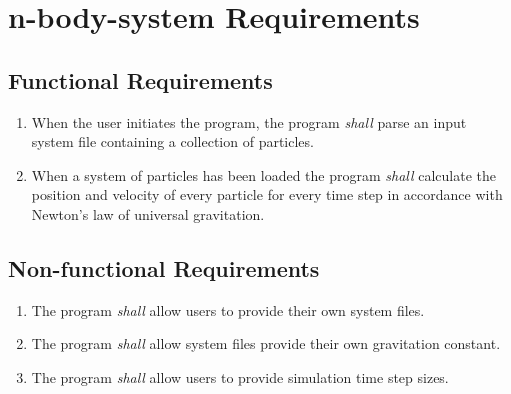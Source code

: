 \documentclass[12pt]{article}
\begin{document}
\section*{n-body-system Requirements}
	\subsection*{Functional Requirements}
		\begin{enumerate}[label=FR-\arabic*]
			\item \label{FR.Initiate} When the user initiates the program, the program {\em shall} parse an input system file containing a collection of particles.
			\item \label{FR.Calculate} When a system of particles has been loaded the program {\em shall} calculate the position and velocity of every particle for every time step in accordance with Newton's law of universal gravitation.
		\end{enumerate}
	\subsection*{Non-functional Requirements}
		\begin{enumerate}[label=NR-\arabic*]
			\item \label{NF.UsersProvideFile} The program {\em shall} allow users to provide their own system files. 
			\item \label{NF.SystemsProvideG} The program {\em shall} allow system files provide their own gravitation constant. 
			\item The program \label{NF.UsersProvideTime} {\em shall} allow users to provide simulation time step sizes. 
		\end{enumerate}
\end{document}
